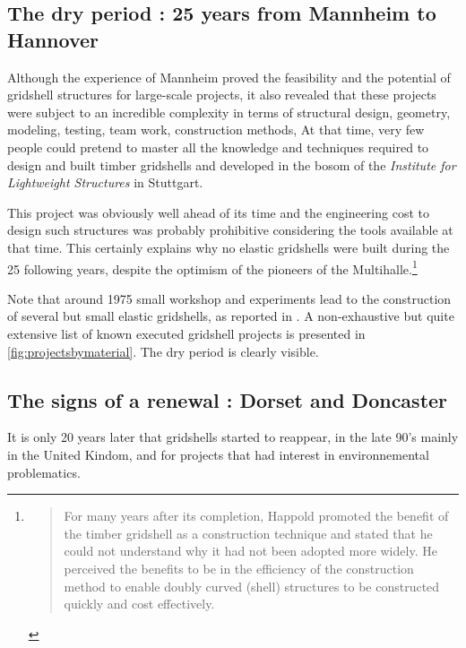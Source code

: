 \subsection{The dry period : 25 years from Mannheim to Hannover}

Although the experience of Mannheim proved the feasibility and the potential of gridshell structures for large-scale projects, it also revealed that these projects were subject to an incredible complexity in terms of structural design, geometry, modeling, testing, team work, construction methods, \telp{} At that time, very few people could pretend to master all the knowledge and techniques required to design and built timber gridshells and developed in the bosom of the \emph{Institute for Lightweight Structures} in Stuttgart. 

This project was obviously well ahead of its time and the engineering cost to design such structures was probably prohibitive considering the tools available at that time. This certainly explains why no elastic gridshells were built during the 25 following years, despite the optimism of the pioneers of the Multihalle.\footnote{\blockcquote[]{Harris2003}{For many years after its completion, Happold promoted the benefit of the timber gridshell as a construction technique and stated that he could not understand why it had not been adopted more widely. He perceived the benefits to be in the efficiency of the construction method to enable doubly curved (shell) structures to be constructed quickly and cost effectively.}.}

Note that around 1975 small workshop and experiments lead to the construction of several but small elastic gridshells, as reported in \cite{IL10}. A non-exhaustive but quite extensive list of known executed gridshell projects is presented in \cref{fig:projectsbymaterial}. The dry period is clearly visible.

\subsection{The signs of a renewal : Dorset and Doncaster}\label{sec:signs}

It is only 20 years later that gridshells started to reappear, in the late 90's mainly in the United Kindom, and for projects that had interest in environnemental problematics.

